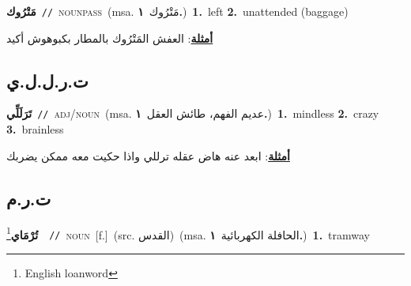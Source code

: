\documentclass[10pt,a4paper,twoside]{article} %
\begin{document}
\begin{multicols}{2}
{\setlength\topsep{0pt}\textbf{\foreignlanguage{arabic}{مَتْرُوك}}\ {\color{gray}\texttt{//}\color{black}}\ \textsc{noun\textunderscore pass}\ \color{gray}(msa. \foreignlanguage{arabic}{مَتْرُوك}~\foreignlanguage{arabic}{\textbf{١.}})\color{black}\ \textbf{1.}~left  \textbf{2.}~unattended (baggage)\  \begin{flushright}\color{gray}\foreignlanguage{arabic}{\textbf{\underline{\foreignlanguage{arabic}{أمثلة}}}: العفش المَتْرُوك بالمطار بكبوهوش أكيد}\end{flushright}\color{black}} \vspace{2mm}

\vspace{-3mm}
\subsection*{\color{blue}\foreignlanguage{arabic}{ت.ر.ل.ل.ي}\color{blue}{ (ntws)}} 

{\setlength\topsep{0pt}\textbf{\foreignlanguage{arabic}{تَرَلَلِّي}}\ {\color{gray}\texttt{//}\color{black}}\ \textsc{adj/noun}\ \color{gray}(msa. \foreignlanguage{arabic}{عديم الفهم، طائش العقل}~\foreignlanguage{arabic}{\textbf{١.}})\color{black}\ \textbf{1.}~mindless  \textbf{2.}~crazy  \textbf{3.}~brainless\  \begin{flushright}\color{gray}\foreignlanguage{arabic}{\textbf{\underline{\foreignlanguage{arabic}{أمثلة}}}: ابعد عنه هاض عقله ترللي واذا حكيت معه ممكن يضربك}\end{flushright}\color{black}} \vspace{2mm}

\vspace{-3mm}
\subsection*{\color{blue}\foreignlanguage{arabic}{ت.ر.م}\color{blue}{ (ntws)}} 

{\setlength\topsep{0pt}\textbf{\foreignlanguage{arabic}{تُرْمَاي}}\footnote{English loanword}\ \ {\color{gray}\texttt{//}\color{black}}\ \textsc{noun}\ [f.]\ (src. \color{gray}\foreignlanguage{arabic}{القدس}\color{black})\ \color{gray}(msa. \foreignlanguage{arabic}{الحافلة الكهربائية}~\foreignlanguage{arabic}{\textbf{١.}})\color{black}\ \textbf{1.}~tramway\ } \vspace{2mm}


\end{multicols}
\end{document}
